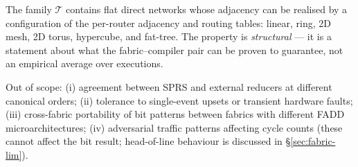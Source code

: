 \documentclass[journal,10pt]{IEEEtran}
\theoremstyle{plain}
\theoremstyle{definition}
\theoremstyle{remark}
\newcommand{\sprs}{\textsc{SPRS}}
\newcommand{\T}{\ensuremath{\mathcal{T}}}
\begin{document}
The family $\T$ contains flat direct networks whose adjacency can be
realised by a configuration of the per-router adjacency and routing tables:
linear, ring, 2D mesh, 2D torus, hypercube, and fat-tree. The property is
\emph{structural} --- it is a statement about what the fabric--compiler
pair can be proven to guarantee, not an empirical average over executions.

Out of scope: (i) agreement between \sprs{} and external reducers at
different canonical orders; (ii) tolerance to single-event upsets or
transient hardware faults; (iii) cross-fabric portability of bit patterns
between fabrics with different FADD microarchitectures; (iv) adversarial
traffic patterns affecting cycle counts (these cannot affect the bit
result; head-of-line behaviour is discussed in \S\ref{sec:fabric-lim}).
\end{document}
